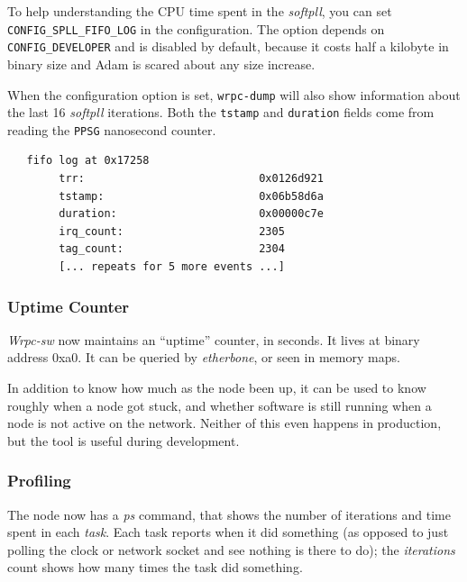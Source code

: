 \documentclass[a4paper, 12pt]{article}
\begin{document}
To help understanding the CPU time spent in the \textit{softpll}, you can
set \texttt{CONFIG\_SPLL\_FIFO\_LOG} in the configuration. The option
depends on \texttt{CONFIG\_DEVELOPER} and is disabled by default, because
it costs half a kilobyte in binary size and Adam is scared about any size
increase.

When the configuration option is set, \texttt{wrpc-dump} will also show
information about the last 16 \textit{softpll} iterations. Both the \texttt{tstamp}
and \texttt{duration} fields come from reading the \texttt{PPSG} nanosecond counter.

\begin{lstlisting}
   fifo log at 0x17258
        trr:                           0x0126d921
        tstamp:                        0x06b58d6a
        duration:                      0x00000c7e
        irq_count:                     2305
        tag_count:                     2304
        [... repeats for 5 more events ...]
\end{lstlisting}

\subsubsection{Uptime Counter}
\label{Uptime Counter}

\textit{Wrpc-sw} now maintains an ``uptime'' counter, in seconds. It lives
at binary address 0xa0. It can be queried by \textit{etherbone}, or
seen in memory maps.

In addition to know how much as the node been up, it can be used to
know roughly when a node got stuck, and whether software is still
running when a node is not active on the network. Neither of this even
happens in production, but the tool is useful during development.

\subsubsection{Profiling}
\label{Profiling}

The node now has a \textit{ps} command, that shows the number of iterations
and time spent in each \textit{task}. Each task reports when it did
something (as opposed to just polling the clock or network socket and
see nothing is there to do); the \textit{iterations} count shows how many
times the task did something.
\end{document}
